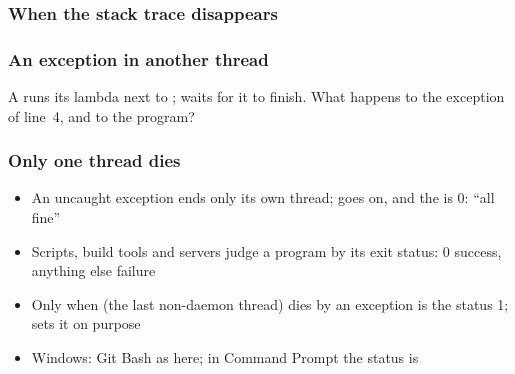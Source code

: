 \documentclass[aspectratio=169,10pt,compress]{beamer}
\begin{document}
\begin{frame}[t,fragile] \frametitle{When the stack trace disappears}
\end{frame}








\begin{frame}[t,fragile] \frametitle{An exception in another thread}

	\footnotesize A  runs its lambda next to ;  waits for it to finish. What happens to the
	exception of line~4, and to the program?
\end{frame}




\begin{frame}[t,fragile] \frametitle{Only one thread dies}

	\begin{itemize}\footnotesize
		\item<2-> An uncaught exception ends only its own thread;  goes on, and the  is 0: ``all fine''
		\item<2-> Scripts, build tools and servers judge a program by its exit status: 0 success, anything else failure
		\item<2-> Only when  (the last non-daemon thread) dies by an exception is the status 1;
			   sets it on purpose
		\item<2-> Windows: Git Bash as here; in Command Prompt the status is 
	\end{itemize}
\end{frame}
\end{document}
